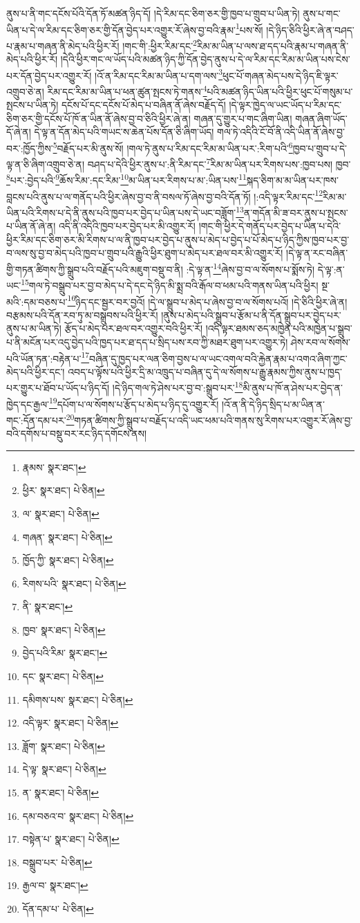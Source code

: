 ནུས་པ་ནི་གང་དངོས་པོའི་དོན་ཏོ་མཚན་ཉིད་དོ། །དེ་རིམ་དང་ཅིག་ཅར་གྱི་ཁྱབ་པ་གྲུབ་པ་ཡིན་ཏེ། ནུས་པ་གང་ཡིན་པ་དེ་ལ་རིམ་དང་ཅིག་ཅར་གྱི་དོན་བྱེད་པར་འགྱུར་རོ་ཞེས་བྱ་བའི་རྣམ་\footnote{རྣམས་  སྣར་ཐང་། }པས་སོ། །དེ་ཉིད་ཅིའི་ཕྱིར་ཞེ་ན་བཤད་པ་རྣམ་པ་གཞན་ནི་མེད་པའི་ཕྱིར་རོ། །གང་གི་:ཕྱིར་རིམ་དང་\footnote{ཕྱིར་  སྣར་ཐང་།  པེ་ཅིན། }རིམ་མ་ཡིན་པ་ལས་ཐ་དད་པའི་རྣམ་པ་གཞན་ནི་མེད་པའི་ཕྱིར་རོ། །དེའི་ཕྱིར་གང་ལ་ཡོད་པའི་མཚན་ཉིད་ཀྱི་དོན་བྱེད་ནུས་པ་དེ་ལ་རིམ་དང་རིམ་མ་ཡིན་པས་ངེས་པར་དོན་བྱེད་པར་འགྱུར་རོ། །འོ་ན་རིམ་དང་རིམ་མ་ཡིན་པ་དག་ལས་\footnote{ལ་  སྣར་ཐང་།  པེ་ཅིན། }ཕུང་པོ་གཞན་མེད་པས་དེ་ཉིད་ཇི་ལྟར་འགྲུབ་ཅེ་ན། རིམ་དང་རིམ་མ་ཡིན་པ་ཕན་ཚུན་སྤངས་ཏེ་གནས་\footnote{གཞན་  སྣར་ཐང་།  པེ་ཅིན། }པའི་མཚན་ཉིད་ཡིན་པའི་ཕྱིར་ཕུང་པོ་གསུམ་པ་སྤངས་པ་ཡིན་ཏེ། དངོས་པོ་དང་དངོས་པོ་མེད་པ་བཞིན་ནོ་ཞེས་བརྗོད་དོ། །དེ་ལྟར་ཁྱེད་ལ་ཡང་ཡོད་པ་རིམ་དང་ཅིག་ཅར་གྱི་དངོས་པོ་ཁོ་ན་ཡིན་ནོ་ཞེས་བྱ་བ་ཅིའི་ཕྱིར་ཞེ་ན། གཞན་དུ་གྱུར་པ་གང་ཞིག་ཡིན། གཞན་ཞིག་ཡོད་དོ་ཞེ་ན། དེ་ལྟ་ན་དོན་མེད་པའི་གཡང་ས་ཆེན་པོས་དོན་ཅི་ཞིག་ཡོད། གལ་ཏེ་འདིའི་ངོ་བོ་ནི་འདི་ཡིན་ནོ་ཞེས་བྱ་བར་:ཁྱོད་ཀྱིས་\footnote{ཁྱོད་ཀྱི་  སྣར་ཐང་།  པེ་ཅིན། }བརྗོད་པར་མི་ནུས་སོ། །གལ་ཏེ་ནུས་པ་རིམ་དང་རིམ་མ་ཡིན་པར་:རིག་པའི་\footnote{རིགས་པའི་  སྣར་ཐང་།  པེ་ཅིན། }ཁྱབ་པ་གྲུབ་པ་དེ་ལྟ་ན་ཅི་ཞིག་འགྲུབ་ཅེ་ན། བཤད་པ་དེའི་ཕྱིར་ནུས་པ་:ནི་རིམ་དང་\footnote{ནི་  སྣར་ཐང་། }རིམ་མ་ཡིན་པར་རིགས་པས་:ཁྱབ་པས། ཁྱབ་\footnote{ཁྱབ་  སྣར་ཐང་།  པེ་ཅིན། }པར་:བྱེད་པའི་\footnote{བྱེད་པའི་རིམ་  སྣར་ཐང་། }ཆོས་རིམ་:དང་རིམ་\footnote{དང་  སྣར་ཐང་།  པེ་ཅིན། }མ་ཡིན་པར་རིགས་པ་མ་:ཡིན་པས་\footnote{དམིགས་པས་  སྣར་ཐང་།  པེ་ཅིན། }སྐད་ཅིག་མ་མ་ཡིན་པར་ཁས་བླངས་པའི་ནུས་པ་ལ་གནོད་པའི་ཕྱིར་ཞེས་བྱ་བ་ནི་བསལ་ཏོ་ཞེས་བྱ་བའི་དོན་ཏོ། །:འདི་ལྟར་རིམ་དང་\footnote{འདི་ལྟར་  སྣར་ཐང་།  པེ་ཅིན། }རིམ་མ་ཡིན་པའི་རིགས་པ་དེ་ནི་ནུས་པའི་ཁྱབ་པར་བྱེད་པ་ཡིན་པས་དེ་ཡང་བཟློག་\footnote{ཟློག་  སྣར་ཐང་།  པེ་ཅིན། }ན་གདོན་མི་ཟ་བར་ནུས་པ་སྤངས་པ་ཡིན་ནོ་ཞེ་ན། འདི་ནི་འདིའི་ཁྱབ་པར་བྱེད་པར་མི་འགྱུར་རོ། །གང་གི་ཕྱིར་དེ་གནོད་པར་བྱེད་པ་ཡིན་པ་དེའི་ཕྱིར་རིམ་དང་ཅིག་ཅར་མི་རིགས་པ་ལ་ནི་ཁྱབ་པར་བྱེད་པ་ནུས་པ་མེད་པ་བྱེད་པ་པོ་མེད་པ་ཉིད་ཀྱིས་ཁྱབ་པར་བྱ་བ་ལས་སུ་བྱ་བ་མེད་པའི་ཁྱབ་པ་གྲུབ་པའི་རྒྱུའི་ཕྱིར་ཐུག་པ་མེད་པར་ཐལ་བར་མི་འགྱུར་རོ། །དེ་ལྟ་ན་རང་བཞིན་གྱི་གཏན་ཚིགས་ཀྱི་སྒྲུབ་པའི་བརྗོད་པའི་མཇུག་བསྡུ་བ་ནི། :དེ་ལྟ་ན་\footnote{དེ་ལྟ་  སྣར་ཐང་།  པེ་ཅིན། }ཞེས་བྱ་བ་ལ་སོགས་པ་སྨོས་ཏེ། དེ་ལྟ་:ན་ཡང་\footnote{ན་  སྣར་ཐང་།  པེ་ཅིན། }གལ་ཏེ་བསྒྲུབ་པར་བྱ་བ་མེད་པ་དེ་དང་དེ་ཉིད་མི་སྨྲ་བའི་རྒོལ་བ་ཕམ་པའི་གནས་ཡིན་པའི་ཕྱིར། སྔ་མའི་:དམ་བཅས་པ་\footnote{དམ་བཅའ་བ་  སྣར་ཐང་།  པེ་ཅིན། }ཉིད་དང་སྦྱར་བར་བྱའོ། །དེ་ལ་སྒྲུབ་པ་མེད་པ་ཞེས་བྱ་བ་ལ་སོགས་པའོ། །དེ་ཅིའི་ཕྱིར་ཞེ་ན། བརྩམས་པའི་དོན་རབ་ཏུ་མ་བསྒྲུབས་པའི་ཕྱིར་རོ། །ནུས་པ་མེད་པའི་སྒྲུབ་པ་རྩོམ་པ་ནི་དོན་སྒྲུབ་པར་བྱེད་པར་ནུས་པ་མ་ཡིན་ཏེ། རྩོད་པ་མེད་པར་ཐལ་བར་འགྱུར་བའི་ཕྱིར་རོ། །འདི་ལྟར་ཐམས་ཅད་མཁྱེན་པའི་མཁྱེན་པ་སྒྲུབ་པ་ནི་མངོན་པར་འདུ་བྱེད་པའི་ཁྱད་པར་ཐ་དད་པ་སྲིད་པས་རབ་ཀྱི་མཐར་ཐུག་པར་འགྱུར་ཏེ། ཤེས་རབ་ལ་སོགས་པའི་ཡོན་ཏན་:བརྟེན་པ་\footnote{བསྟེན་པ་  སྣར་ཐང་།  པེ་ཅིན། }བཞིན་དུ་ཁྱད་པར་ལན་ཅིག་བྱས་པ་ལ་ཡང་འགལ་བའི་རྐྱེན་རྣམ་པ་འགའ་ཞིག་ཀྱང་མེད་པའི་ཕྱིར་དང་། འབད་པ་ལྟོས་པའི་ཕྱིར་དྲི་མ་འཁྲུད་པ་བཞིན་དུ་དེ་ལ་སོགས་པ་རྒྱུ་རྣམས་ཀྱིས་ནུས་པ་ཁྱད་པར་གྱུར་པ་ཐོབ་པ་ཡོད་པ་ཉིད་དོ། །དེ་ཉིད་གལ་ཏེ་ཤེས་པར་བྱ་བ་:སྒྲུབ་པར་\footnote{བསྒྲུབ་པར་  པེ་ཅིན། }མི་ནུས་པ་ཁོ་ན་ཤེས་པར་བྱེད་ན་ཁྱེད་དང་རྒྱལ་\footnote{རྒྱལ་བ་  སྣར་ཐང་། }དཔོག་པ་ལ་སོགས་པ་རྩོད་པ་མེད་པ་ཉིད་དུ་འགྱུར་རོ། །འོ་ན་ནི་དེ་ཉིད་སྲིད་པ་མ་ཡིན་ན་གང་:དོན་དམ་པར་\footnote{དོན་དམ་པ་  པེ་ཅིན། }གཏན་ཚིགས་ཀྱི་སྒྲུབ་པ་བརྗོད་པ་འདི་ཡང་ཕམ་པའི་གནས་སུ་རིགས་པར་འགྱུར་རོ་ཞེས་བྱ་བའི་དགོས་པ་བསྡུ་བར་རང་ཉིད་དགོངས་ནས། 